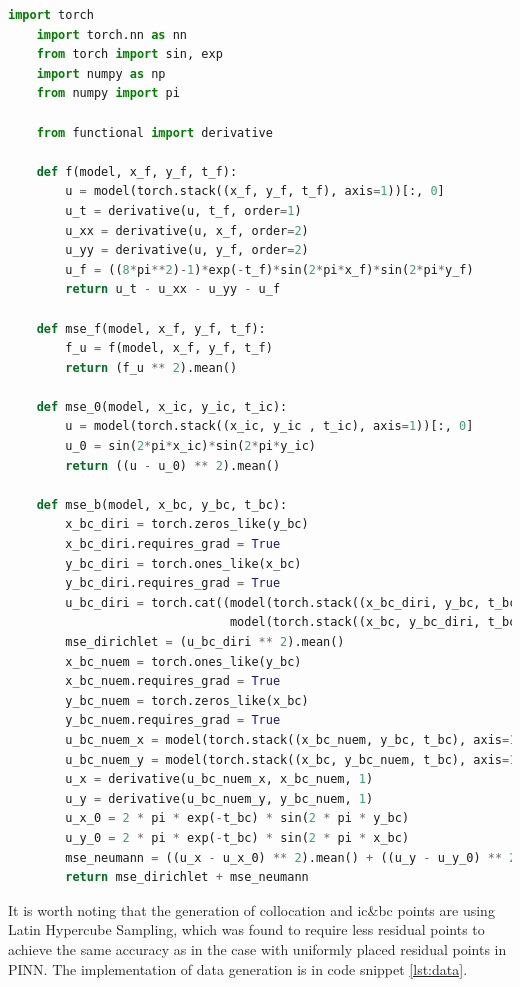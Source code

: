 \documentclass[11pt, a4paper]{article}
\begin{document}
    \lstset{style=mystyle}
    \begin{lstlisting}[language=Python, caption=Implementation of MSEs using PyTorch, label={lst:mse}]
    import torch
    import torch.nn as nn
    from torch import sin, exp
    import numpy as np
    from numpy import pi

    from functional import derivative

    def f(model, x_f, y_f, t_f):
        u = model(torch.stack((x_f, y_f, t_f), axis=1))[:, 0]
        u_t = derivative(u, t_f, order=1)
        u_xx = derivative(u, x_f, order=2)
        u_yy = derivative(u, y_f, order=2)
        u_f = ((8*pi**2)-1)*exp(-t_f)*sin(2*pi*x_f)*sin(2*pi*y_f)
        return u_t - u_xx - u_yy - u_f

    def mse_f(model, x_f, y_f, t_f):
        f_u = f(model, x_f, y_f, t_f)
        return (f_u ** 2).mean()

    def mse_0(model, x_ic, y_ic, t_ic):
        u = model(torch.stack((x_ic, y_ic , t_ic), axis=1))[:, 0]
        u_0 = sin(2*pi*x_ic)*sin(2*pi*y_ic)
        return ((u - u_0) ** 2).mean()

    def mse_b(model, x_bc, y_bc, t_bc):
        x_bc_diri = torch.zeros_like(y_bc)
        x_bc_diri.requires_grad = True
        y_bc_diri = torch.ones_like(x_bc)
        y_bc_diri.requires_grad = True
        u_bc_diri = torch.cat((model(torch.stack((x_bc_diri, y_bc, t_bc), axis=1))[:, 0],
                               model(torch.stack((x_bc, y_bc_diri, t_bc), axis=1))[:, 0]))
        mse_dirichlet = (u_bc_diri ** 2).mean()
        x_bc_nuem = torch.ones_like(y_bc)
        x_bc_nuem.requires_grad = True
        y_bc_nuem = torch.zeros_like(x_bc)
        y_bc_nuem.requires_grad = True
        u_bc_nuem_x = model(torch.stack((x_bc_nuem, y_bc, t_bc), axis=1))[:, 0]
        u_bc_nuem_y = model(torch.stack((x_bc, y_bc_nuem, t_bc), axis=1))[:, 0]
        u_x = derivative(u_bc_nuem_x, x_bc_nuem, 1)
        u_y = derivative(u_bc_nuem_y, y_bc_nuem, 1)
        u_x_0 = 2 * pi * exp(-t_bc) * sin(2 * pi * y_bc)
        u_y_0 = 2 * pi * exp(-t_bc) * sin(2 * pi * x_bc)
        mse_neumann = ((u_x - u_x_0) ** 2).mean() + ((u_y - u_y_0) ** 2).mean()
        return mse_dirichlet + mse_neumann
    \end{lstlisting}

    It is worth noting that the generation of collocation and ic\&bc points are using Latin Hypercube Sampling, 
    which was found to require less residual points to achieve the same accuracy as in the case with uniformly placed residual points in PINN. \cite{LHS}
    The implementation of data generation is in code snippet \ref{lst:data}.
\end{document}
